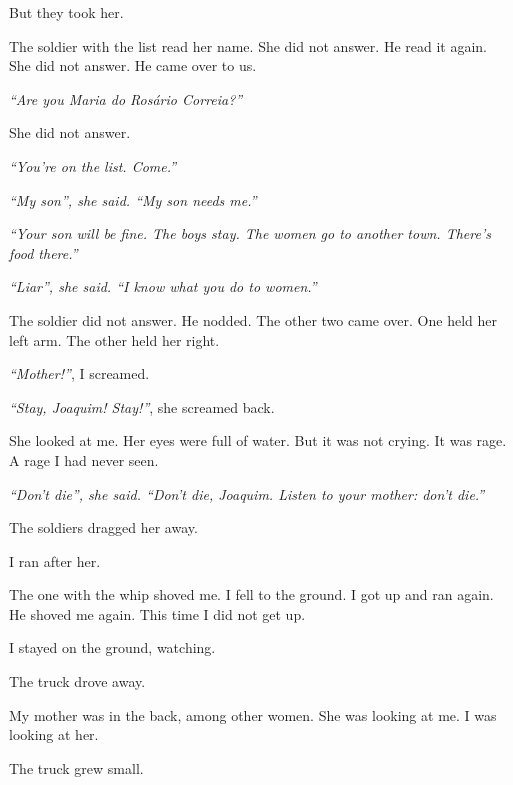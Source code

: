 \noindent But they took her.

\noindent The soldier with the list read her name. She did not answer. He read it again. She did not answer. He came over to us.

\noindent \textit{\textquotedblleft{}Are you Maria do Rosário Correia?\textquotedblright{}}

\noindent She did not answer.

\noindent \textit{\textquotedblleft{}You're on the list. Come.\textquotedblright{}}

\noindent \textit{\textquotedblleft{}My son\textquotedblright{}\textit{, she said. }\textquotedblleft{}My son needs me.\textquotedblright{}}

\noindent \textit{\textquotedblleft{}Your son will be fine. The boys stay. The women go to another town. There's food there.\textquotedblright{}}

\noindent \textit{\textquotedblleft{}Liar\textquotedblright{}\textit{, she said. }\textquotedblleft{}I know what you do to women.\textquotedblright{}}

\noindent The soldier did not answer. He nodded. The other two came over. One held her left arm. The other held her right.

\noindent \textit{\textquotedblleft{}Mother!\textquotedblright{}}, I screamed.

\noindent \textit{\textquotedblleft{}Stay, Joaquim! Stay!\textquotedblright{}}, she screamed back.

\noindent She looked at me. Her eyes were full of water. But it was not crying. It was rage. A rage I had never seen.

\noindent \textit{\textquotedblleft{}Don't die\textquotedblright{}\textit{, she said. }\textquotedblleft{}Don't die, Joaquim. Listen to your mother: don't die.\textquotedblright{}}

\noindent The soldiers dragged her away.

\noindent I ran after her.

\noindent The one with the whip shoved me. I fell to the ground. I got up and ran again. He shoved me again. This time I did not get up.

\noindent I stayed on the ground, watching.

\noindent The truck drove away.

\noindent My mother was in the back, among other women. She was looking at me. I was looking at her.

\noindent The truck grew small.

